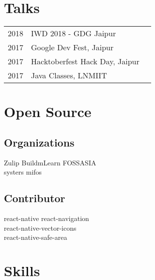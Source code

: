 \documentclass[a4paper]{deedy-resume} %
\begin{document}
\begin{minipage}[t]{0.33\textwidth}
\sectionspace %


\section{Talks}

\begin{tabular}{rll}
2018 & IWD 2018 - GDG Jaipur\\
2017 & Google Dev Fest, Jaipur\\
2017 & Hacktoberfest Hack Day, Jaipur\\
2017 & Java Classes, LNMIIT\\
\end{tabular}

\sectionspace %


\section{Open Source}
\subsection{Organizations}

Zulip \textbullet{} BuildmLearn  \textbullet{} FOSSASIA \\
systers \textbullet{} mifos \\

\sectionspace %

\subsection{Contributor}

\textbullet{} react-native
\textbullet{} react-navigation \\
\textbullet{} react-native-vector-icons \\
\textbullet{} react-native-safe-area

\sectionspace %


\section{Skills}


\end{minipage}
\end{document}
